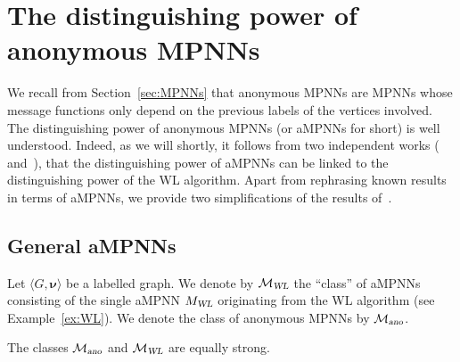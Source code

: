 \section{The distinguishing power of anonymous MPNNs}
We recall from Section~\ref{sec:MPNNs} that anonymous MPNNs are MPNNs whose message functions
only depend on the previous labels of the vertices involved. The distinguishing power of anonymous MPNNs (or aMPNNs for short) is well understood.
Indeed, as we will shortly, it follows from two independent works (\cite{xhlj19} and~\cite{grohewl}), that the distinguishing power of aMPNNs can be linked to the distinguishing power of the WL algorithm. Apart from rephrasing known results in terms of aMPNNs, we provide two simplifications of the results of~\cite{grohewl}.

\subsection{General aMPNNs}
Let $\langle G,\pmb{\nu}\rangle$ be a labelled graph.
We denote by $\mathcal{M}_{\textsl{WL}}$ the ``class'' of aMPNNs consisting of the single aMPNN $M_{\textsl{WL}}$ originating from the WL algorithm (see Example~\ref{ex:WL}). We denote the class of anonymous MPNNs by $\mathcal{M}_{\textsl{ano}}$.

\begin{theorem}\label{thm:eqstrongWL}
The classes $\mathcal{M}_{\textsl{ano}}$ and  $\mathcal{M}_{\textsl{WL}}$ are equally strong.
\end{theorem}


